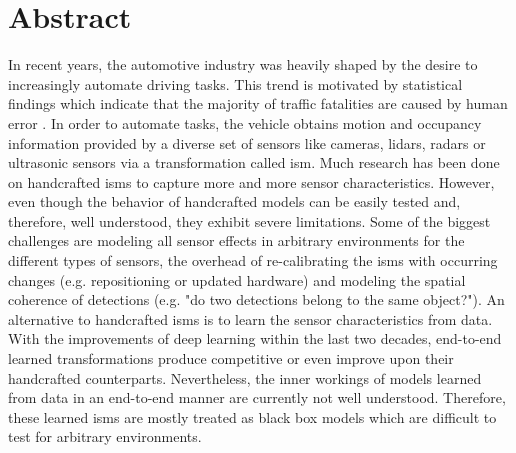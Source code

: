 \section*{Abstract}
\label{ch:abstract}
In recent years, the automotive industry was heavily shaped by the desire to increasingly automate driving tasks. This trend is motivated by statistical findings which indicate that the majority of traffic fatalities are caused by human error \cite{world2018global}. In order to automate tasks, the vehicle obtains motion and occupancy information provided by a diverse set of sensors like cameras, lidars, radars or ultrasonic sensors via a transformation called \gls{ism}. Much research has been done on handcrafted \gls{ism}s to capture more and more sensor characteristics. However, even though the behavior of handcrafted models can be easily tested and, therefore, well understood, they exhibit severe limitations. Some of the biggest challenges are modeling all sensor effects in arbitrary environments for the different types of sensors, the overhead of re-calibrating the \gls{ism}s with occurring changes (e.g. repositioning or updated hardware) and modeling the spatial coherence of detections (e.g. "do two detections belong to the same object?"). An alternative to handcrafted \gls{ism}s is to learn the sensor characteristics from data. With the improvements of deep learning within the last two decades, end-to-end learned transformations produce competitive or even improve upon their handcrafted counterparts. Nevertheless, the inner workings of models learned from data in an end-to-end manner are currently not well understood. Therefore, these learned \gls{ism}s are mostly treated as black box models which are difficult to test for arbitrary environments.
\\\\
